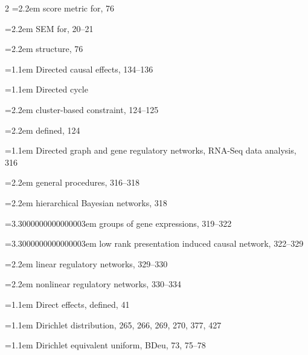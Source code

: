 \begin{multicols}{2}
\noindent\hangindent=2.2em \hspace*{1.1em}score metric for, 76\par
\noindent\hangindent=2.2em \hspace*{1.1em}SEM for, 20--21\par
\noindent\hangindent=2.2em \hspace*{1.1em}structure, 76\par
\noindent\hangindent=1.1em Directed causal effects, 134--136\par
\noindent\hangindent=1.1em Directed cycle\par
\noindent\hangindent=2.2em \hspace*{1.1em}cluster-based constraint, 124--125\par
\noindent\hangindent=2.2em \hspace*{1.1em}defined, 124\par
\noindent\hangindent=1.1em Directed graph and gene regulatory networks, RNA-Seq data analysis, 316\par
\noindent\hangindent=2.2em \hspace*{1.1em}general procedures, 316--318\par
\noindent\hangindent=2.2em \hspace*{1.1em}hierarchical Bayesian networks, 318\par
\noindent\hangindent=3.3000000000000003em \hspace*{2.2em}groups of gene expressions, 319--322\par
\noindent\hangindent=3.3000000000000003em \hspace*{2.2em}low rank presentation induced causal network, 322--329\par
\noindent\hangindent=2.2em \hspace*{1.1em}linear regulatory networks, 329--330\par
\noindent\hangindent=2.2em \hspace*{1.1em}nonlinear regulatory networks, 330--334\par
\noindent\hangindent=1.1em Direct effects, defined, 41\par
\noindent\hangindent=1.1em Dirichlet distribution, 265, 266, 269, 270, 377, 427\par
\noindent\hangindent=1.1em Dirichlet equivalent uniform, BDeu, 73, 75--78\par

\end{multicols}
